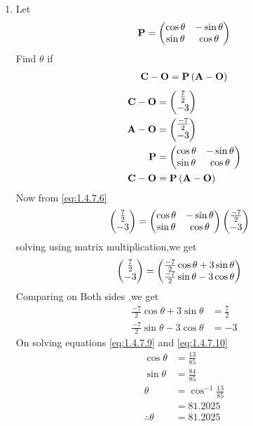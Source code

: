 \documentclass[11pt]{book}
\begin{document}
\begin{enumerate}[label=\thesection.\arabic*.,ref=\thesection.\theenumi]
\item Let 
\begin{align}
\mathbf{P} = \begin{pmatrix}\cos \theta & -\sin \theta \\ \sin \theta & \cos \theta\end{pmatrix}
\end{align}
Find $\theta$ if 
\begin{align}
\mathbf{C}-\mathbf{O}=\mathbf{P}\left(\mathbf{A}-\mathbf{O}\right)
\end{align}
\solution
\begin{align}
    \vec{C}-\vec{O}
	  & =\myvec{ \frac{7}{2} \\ -3 }\\
\vec{A}-\vec{O}
	 & =\myvec{\frac{-7}{2} \\ -3}
	  \\
\vec{P} &= \myvec{\cos \theta & -\sin \theta \\ \sin \theta & \cos \theta} \\
   \vec{C}-\vec{O}&=\vec{P}\brak{\vec{A}-\vec{O}} \label{eq:1.4.7.6}
\end{align}
 Now from \eqref{eq:1.4.7.6}
 \begin{align}
 \begin{pmatrix}\frac{7}{2}\\ -3\end{pmatrix} &= \begin{pmatrix}\cos \theta & -\sin \theta \\ \sin \theta & \cos \theta\end{pmatrix} \begin{pmatrix}\frac{-7}{2}\\ -3\end{pmatrix}    
 \end{align}
solving using matrix multiplication,we get
\begin{align}
	\begin{pmatrix}\frac{7}{2}\\ -3\end{pmatrix} &= \begin{pmatrix} \frac{-7}{2}\cos\theta + 3\sin\theta \\ \frac{-7}{2}\sin\theta - 3\cos\theta\end{pmatrix}
\end{align}
Comparing on Both sides ,we get
\begin{align}
     \frac{-7}{2}\cos\theta + 3\sin\theta &= \frac{7}{2}   \label{eq:1.4.7.9}\\
 \frac{-7}{2}\sin\theta - 3\cos\theta &= -3 \label{eq:1.4.7.10}
\end{align}
On solving equations \eqref{eq:1.4.7.9}  and \eqref{eq:1.4.7.10}
\begin{align}
    \cos\theta&= \frac{13}{85} \\
    \sin\theta&= \frac{84}{85} \\
    \theta &=\cos^{-1}\frac{13}{85} \\
            &= 81.2025 \\
	    \therefore \theta &= 81.2025
\end{align}
\end{enumerate}

\latexprintindex
\end{document}
